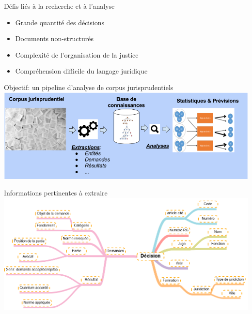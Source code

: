 \documentclass[newPxFont,pagenumber]{beamer}
\begin{document}
\begin{frame}{Défis liés à la recherche et à l'analyse}
\begin{itemize}
\item Grande quantité des décisions
\item Documents non-structurés
\item Complexité de l'organisation de la justice 
\item Compréhension difficile du langage juridique
\end{itemize}
\end{frame}

\begin{frame}{Objectif: un pipeline d'analyse de corpus jurisprudentiels}
\includegraphics[width=\textwidth]{pipeline-cassandra.png}
\end{frame}

\begin{frame}{Informations pertinentes à extraire}
\includegraphics[width=0.9\paperwidth]{arbre-des-infos.PNG}


\end{frame}
\end{document}
